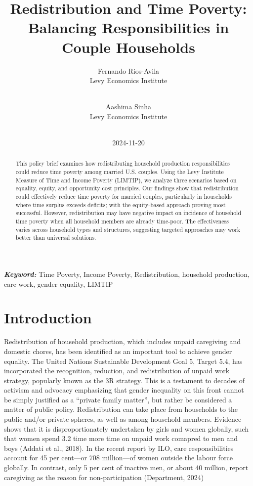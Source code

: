 \documentclass[
  11pt,
]{article}
\title{Redistribution and Time Poverty: Balancing Responsibilities in
Couple Households}
\author{
Fernando Rios-Avila\\
Levy Economics Institute\\
\\
\and 
Aashima Sinha\\
Levy Economics Institute\\
\\
}
\date{2024-11-20}
\begin{document}
\def\spacingset#1{\renewcommand{\baselinestretch}%
{#1}\small\normalsize} \spacingset{1}


\maketitle
\begin{abstract}
This policy brief examines how redistributing household production
responsibilities could reduce time poverty among married U.S. couples.
Using the Levy Institute Measure of Time and Income Poverty (LIMTIP), we
analyze three scenarios based on equality, equity, and opportunity cost
principles. Our findings show that redistribution could effectively
reduce time poverty for married couples, particularly in households
where time surplus exceeds deficits; with the equity-based approach
proving most successful. However, redistribution may have negative
impact on incidence of household time poverty when all household members
are already time-poor. The effectiveness varies across household types
and structures, suggesting targeted approaches may work better than
universal solutions.
\end{abstract}
 
\vspace{.2in}

\textbf{\textit{Keyword: }}Time Poverty, Income Poverty, Redistribution,
household production, care work, gender equality, LIMTIP


\thispagestyle{empty}
\clearpage{}
\newpage
\spacingset{1.2} %
\section{Introduction}\label{introduction}

Redistribution of household production, which includes unpaid caregiving
and domestic chores, has been identified as an important tool to achieve
gender equality. The United Nations Sustainable Development Goal 5,
Target 5.4, has incorporated the recognition, reduction, and
redistribution of unpaid work strategy, popularly known as the 3R
strategy. This is a testament to decades of activism and advocacy
emphasizing that gender inequality on this front cannot be simply
justified as a ``private family matter'', but rather be considered a
matter of public policy. Redistribution can take place from households
to the public and/or private spheres, as well as among household
members. Evidence shows that it is disproportionately undertaken by
girls and women globally, such that women spend 3.2 time more time on
unpaid work comapred to men and boys (Addati et al., 2018). In the
recent report by ILO, care responsibilities account for 45 per cent---or
708 million---of women outside the labour force globally. In contrast,
only 5 per cent of inactive men, or about 40 million, report caregiving
as the reason for non-participation (Department, 2024)
\end{document}
